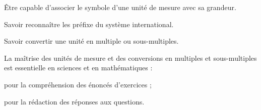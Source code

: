 \teteSndAP
{}

\begin{objectifs}
  \item Être capable d'associer le symbole d'une unité de mesure avec sa grandeur.
  \item Savoir reconnaître les préfixe du système international.
  \item Savoir convertir une unité en multiple ou sous-multiples.
\end{objectifs}

\begin{contexte}  
  La maîtrise des unités de mesure et des conversions en multiples et sous-multiples est essentielle en
  sciences et en mathématiques :
  \begin{listePoints}
    \item pour la compréhension des énoncés d’exercices ;
    \item pour la rédaction des réponses aux questions.
  \end{listePoints}
\end{contexte}

